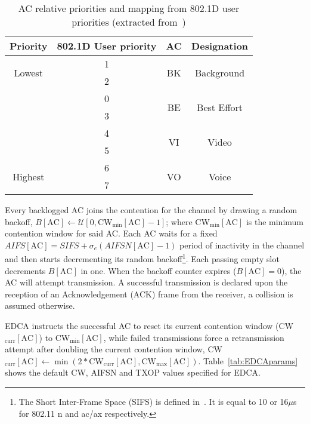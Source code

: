 \documentclass[a4paper]{article}
\begin{document}
	\begin{table}[t]
		\centering
		\caption{AC relative priorities and mapping from 802.1D user priorities (extracted from~\cite{perahia2013next})}
		\label{tab:prioritiesMap}
		\begin{tabular}{|c|c|c|c|}
			\hline
			{\bfseries Priority} & {\bfseries 802.1D User priority} & {\bfseries AC} & {\bfseries Designation}\\
			\hline
			\multirow{2}{*}{Lowest} & 1 & \multirow{2}{*}{BK} & \multirow{2}{*}{Background}\\
			\cline{2-2}
							     & 2 &				    &\\
			\hline
			\multirow{2}{*}{}	     & 0 & \multirow{2}{*}{BE} & \multirow{2}{*}{Best Effort}\\
			\cline{2-2}
							     & 3 & 				     &\\
			\hline
			\multirow{2}{*}{}	     & 4 & \multirow{2}{*}{VI} & \multirow{2}{*}{Video}\\
			\cline{2-2}
							     & 5 & 				     &\\
			\hline
			\multirow{2}{*}{Highest}& 6 & \multirow{2}{*}{VO} & \multirow{2}{*}{Voice}\\
			\cline{2-2}
							     & 7 & 				     &\\
			\hline			
		\end{tabular}
	\end{table}
	
Every backlogged AC joins the contention for the channel by drawing a random backoff, $B[\text{AC}]\leftarrow\mathcal{U}[0,\text{CW}_{\min}[\text{AC}]-1]$; where CW$_{\min}[\text{AC}]$ is the minimum contention window for said AC. Each AC waits for a fixed $AIFS[\text{AC}]=SIFS+\sigma_{e}(AIFSN[\text{AC}]-1)$ period of inactivity in the channel and then starts decrementing its random backoff\footnote{The Short Inter-Frame Space (SIFS) is defined in~\cite{802Standards}. It is equal to 10 or 16$\mu$s for 802.11 n and ac/ax respectively.}. Each passing empty slot decrements $B[\text{AC}]$ in one. When the backoff counter expires ($B[\text{AC}] = 0$), the AC will attempt transmission. A successful transmission is declared upon the reception of an Acknowledgement (ACK) frame from the receiver, a collision is assumed otherwise. 

EDCA instructs the successful AC to reset its current contention window (CW$_{\text{curr}}[\text{AC}]$) to CW$_{\min}[\text{AC}]$, while failed transmissions force a retransmission attempt after doubling the current contention window, CW$_{\text{curr}}[\text{AC}]\leftarrow \min(2 * \text{CW}_{\text{curr}}[\text{AC}], \text{CW}_{\max}[\text{AC}])$. Table~\ref{tab:EDCAparams} shows the default CW, AIFSN and TXOP values specified for EDCA. 
\end{document}

